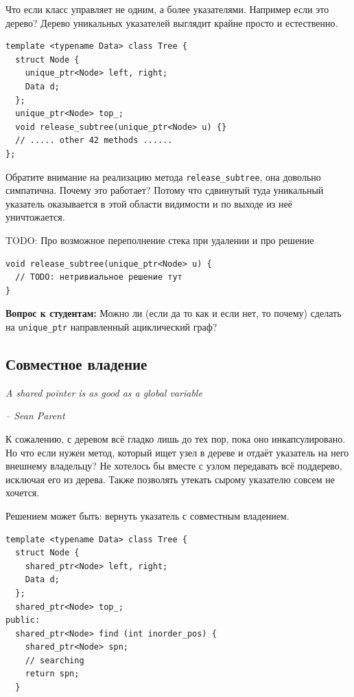 \documentclass[a4paper,12pt,oneside]{book}
\begin{document}
Что если класс управляет не одним, а более указателями. Например если это дерево? Дерево уникальных указателей выглядит крайне просто и естественно.

\begin{lstlisting}
template <typename Data> class Tree {
  struct Node {
    unique_ptr<Node> left, right;
    Data d;
  };
  unique_ptr<Node> top_;
  void release_subtree(unique_ptr<Node> u) {}
  // ..... other 42 methods ......
};
\end{lstlisting}

Обратите внимание на реализацию метода \lstinline!release_subtree!, она довольно симпатична. Почему это работает? Потому что сдвинутый туда уникальный указатель оказывается в этой области видимости и по выходе из неё уничтожается.

TODO: Про возможное переполнение стека при удалении и про решение

\begin{lstlisting}
void release_subtree(unique_ptr<Node> u) {
  // TODO: нетривиальное решение тут
}  
\end{lstlisting}

\textbf{Вопрос к студентам:} Можно ли (если да то как и если нет, то почему) сделать на \lstinline!unique_ptr! направленный ациклический граф?

\subsection{Совместное владение}\label{subsub:sharedptrs}

\hfill\textit{A shared pointer is as good as a global variable} {\vspace{0.5em}}

\hfill\textit{-- Sean Parent}

К сожалению, с деревом всё гладко лишь до тех пор, пока оно инкапсулировано. Но что если нужен метод, который ищет узел в дереве и отдаёт указатель на него внешнему владельцу? Не хотелось бы вместе с узлом передавать всё поддерево, исключая его из дерева. Также позволять утекать сырому указателю совсем не хочется.

Решением может быть: вернуть указатель с совместным владением.

\begin{lstlisting}
template <typename Data> class Tree {
  struct Node {
    shared_ptr<Node> left, right;
    Data d;
  };
  shared_ptr<Node> top_;
public: 
  shared_ptr<Node> find (int inorder_pos) {
    shared_ptr<Node> spn;
    // searching
    return spn;
  }
\end{lstlisting}
\end{document}
